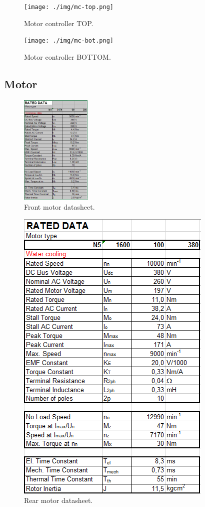 \begin{figure}[H]
	\centering
	\texttt{[image: ./img/mc-top.png]}
	\caption{Motor controller TOP.}
	\label{app:mc-top}
\end{figure}

\begin{figure}[H]
	\centering
	\texttt{[image: ./img/mc-bot.png]}
	\caption{Motor controller BOTTOM.}
	\label{app:mc-bot}
\end{figure}

\subsection{Motor}

\begin{figure}[H]
	\centering
	\includegraphics[width=0.3\textwidth]{./img/app-mf.png}
	\caption{Front motor datasheet.}
	\label{app:mf}
\end{figure}

\begin{figure}[H]
	\centering
	\includegraphics[width=.3\textwidth]{./img/app-mr.png}
	\caption{Rear motor datasheet.}
	\label{app:mr}
\end{figure}



